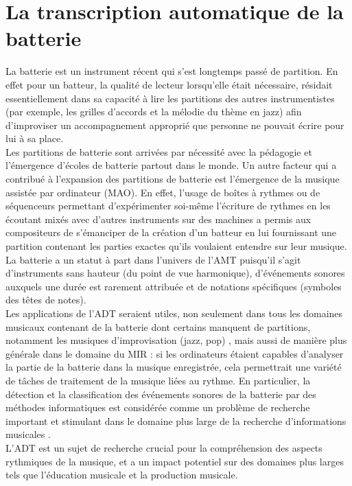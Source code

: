 \section{La transcription automatique de la batterie}
La batterie est un instrument récent qui s’est longtemps passé de partition. En
effet pour un batteur, la qualité de lecteur lorsqu’elle était nécessaire,
résidait essentiellement dans sa capacité à lire les partitions des autres
instrumentistes (par exemple, les grilles d’accords et la mélodie du thème en
jazz) afin d’improviser un accompagnement approprié que personne ne pouvait
écrire pour lui à sa place.\\
Les partitions de batterie sont arrivées par nécessité avec la pédagogie et
l’émergence d’écoles de batterie partout dans le monde. Un autre facteur qui a
contribué à l’expansion des partitions de batterie est l’émergence de la
musique assistée par ordinateur (MAO). En effet, l’usage de boîtes à rythmes ou
de séquenceurs permettant d’expérimenter soi-même l’écriture de rythmes en les
écoutant mixés avec d’autres instruments sur des machines a permis  aux
compositeurs de s’émanciper de la création d’un batteur en lui fournissant une
partition contenant les parties exactes qu’ils voulaient entendre sur leur
musique.\\
La batterie a un statut à part dans l’univers de l’AMT puisqu'il s'agit
d'instruments sans hauteur (du point de vue harmonique), d'événements sonores
auxquels une durée est rarement attribuée et de notations spécifiques (symboles
des têtes de notes).\\
Les applications de l’ADT seraient utiles, non seulement dans tous les domaines
musicaux contenant de la batterie dont certains manquent de partitions,
notamment les musiques d’improvisation (jazz, pop) \cite{future_directions},
mais aussi de manière plus générale dans le domaine du MIR : si les ordinateurs
étaient capables d'analyser la partie de la batterie dans la musique
enregistrée, cela permettrait une variété de tâches de traitement de la musique
liées au rythme. En particulier, la détection et la classification des
événements sonores de la batterie par des méthodes informatiques est considérée
comme un problème de recherche important et stimulant dans le domaine plus
large de la recherche d'informations musicales \cite{Review_ADT}.\\
L'ADT est un sujet de recherche crucial pour la compréhension des aspects
rythmiques de la musique, et a un impact potentiel sur des domaines plus larges
tels que l'éducation musicale et la production musicale.
